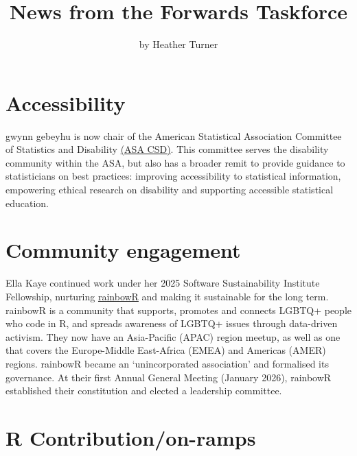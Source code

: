 \title{News from the Forwards Taskforce}


\author{by Heather Turner}

\maketitle


\section{Accessibility}\label{accessibility}

gwynn gebeyhu is now chair of the American Statistical Association
Committee of Statistics and Disability \href{https://ww2.amstat.org/committees/commdetails.cfm?txtComm=CCNDVR02}{(ASA CSD)}. This
committee serves the disability community within the ASA, but also has a broader
remit to provide guidance to statisticians on best practices: improving
accessibility to statistical information, empowering ethical research on
disability and supporting accessible statistical education.

\section{Community engagement}\label{community-engagement}

Ella Kaye continued work under her 2025 Software Sustainability Institute Fellowship, nurturing \href{https://rainbowr.org/}{rainbowR} and making it sustainable for the long term.
rainbowR is a community that supports, promotes and connects LGBTQ+ people who code in R, and
spreads awareness of LGBTQ+ issues through data-driven activism. They now
have an Asia-Pacific (APAC) region meetup, as well as one that covers the
Europe-Middle East-Africa (EMEA) and Americas (AMER) regions. rainbowR became an `unincorporated association' and formalised its governance. At their first Annual General Meeting (January 2026), rainbowR established their constitution and elected a leadership committee.

\section{R Contribution/on-ramps}\label{r-contributionon-ramps}

